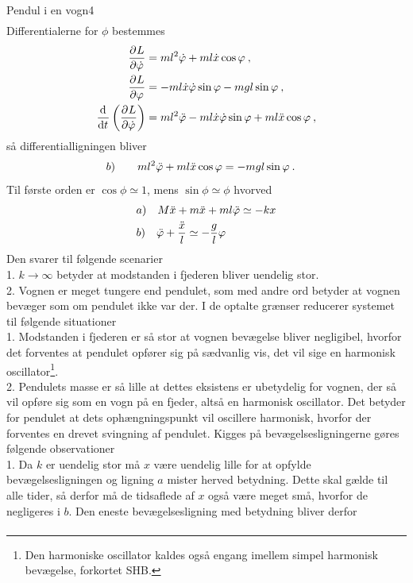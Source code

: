 \begin{opgave}{Pendul i en vogn}{4}
\begin{align*}
\end{align*}
Differentialerne for $\phi$ bestemmes
\begin{align*}
	\frac{\partial^{}{L}}{\partial {\dot{\varphi}}^{}} &= ml^2\dot{\varphi} + ml\dot{x}\cos\varphi \: , \\
	\frac{\partial^{}{L}}{\partial {\varphi}^{}} &= -ml\dot{x}\dot{\varphi}\sin\varphi - mgl\sin\varphi \: ,\\
	\frac{\mathrm{d}^{}{}}{{\mathrm{d} {t}}^{}}\left(\frac{\partial^{}{L}}{\partial {\dot{\varphi}}^{}}\right) &= ml^2\ddot{\varphi} - ml\dot{x}\dot{\varphi}\sin\varphi + ml\ddot{x}\cos\varphi \: ,
\end{align*}
så differentialligningen bliver
\begin{align*}
	b) \qquad ml^2\ddot{\varphi} + ml\ddot{x}\cos\varphi &= -mgl\sin\varphi \: .
\end{align*}
\opg Til første orden er $\cos\phi \simeq 1$, mens $\sin\phi \simeq \phi$ hvorved 
\begin{align*}
&a) \quad M\ddot{x} + m\ddot{x} +ml\ddot{\varphi} \simeq -kx \\
&b) \quad \ddot{\varphi} + \frac{\ddot{x}}{l} \simeq -\frac{g}{l}\varphi
\end{align*}
\opg Den svarer til følgende scenarier \\
1. \quad $k \rightarrow \infty$ betyder at modstanden i fjederen bliver uendelig stor. \\
2. \quad Vognen er meget tungere end pendulet, som med andre ord betyder at vognen bevæger som om pendulet ikke var der.
\opg I de optalte grænser reducerer systemet til følgende situationer \\
1. \quad Modstanden i fjederen er så stor at vognen bevægelse bliver negligibel, hvorfor det forventes at pendulet opfører sig på sædvanlig vis, det vil sige en harmonisk oscillator\footnote{Den harmoniske oscillator kaldes også engang imellem simpel harmonisk bevægelse, forkortet SHB.}. \\
2. \quad Pendulets masse er så lille at dettes eksistens er ubetydelig for vognen, der så vil opføre sig som en vogn på en fjeder, altså en harmonisk oscillator. Det betyder for pendulet at dets ophængningspunkt vil oscillere harmonisk, hvorfor der forventes en drevet svingning af pendulet.
\opg Kigges på bevægelsesligningerne gøres følgende observationer \\
1. \quad Da $k$ er uendelig stor må $x$ være uendelig lille for at opfylde bevægelsesligningen og ligning $a$ mister herved betydning. Dette skal gælde til alle tider, så derfor må de tidsaflede af $x$ også være meget små, hvorfor de negligeres i $b$. Den eneste bevægelsesligning med betydning bliver derfor
\begin{align*}

\end{align*}
\end{opgave}
